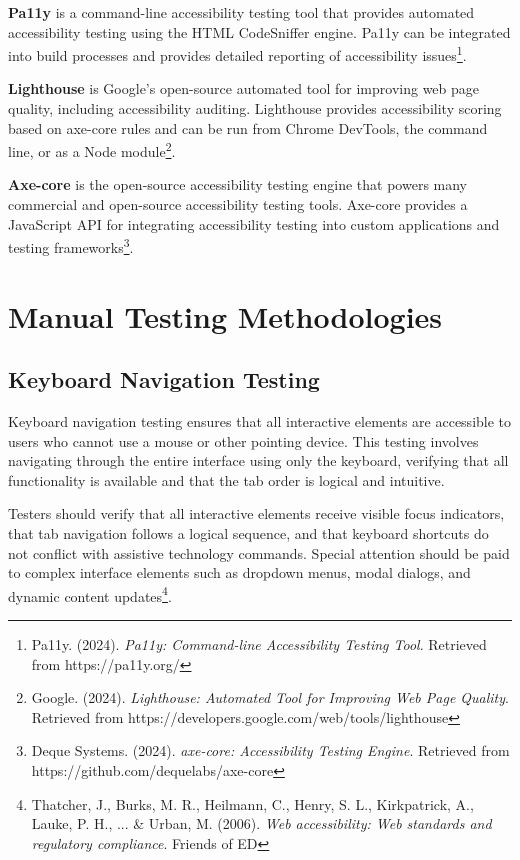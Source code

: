 \textbf{Pa11y} is a command-line accessibility testing tool that provides automated accessibility testing using the HTML CodeSniffer engine. Pa11y can be integrated into build processes and provides detailed reporting of accessibility issues\footnote{Pa11y. (2024). \textit{Pa11y: Command-line Accessibility Testing Tool}. Retrieved from https://pa11y.org/}.

\textbf{Lighthouse} is Google's open-source automated tool for improving web page quality, including accessibility auditing. Lighthouse provides accessibility scoring based on axe-core rules and can be run from Chrome DevTools, the command line, or as a Node module\footnote{Google. (2024). \textit{Lighthouse: Automated Tool for Improving Web Page Quality}. Retrieved from https://developers.google.com/web/tools/lighthouse}.

\textbf{Axe-core} is the open-source accessibility testing engine that powers many commercial and open-source accessibility testing tools. Axe-core provides a JavaScript API for integrating accessibility testing into custom applications and testing frameworks\footnote{Deque Systems. (2024). \textit{axe-core: Accessibility Testing Engine}. Retrieved from https://github.com/dequelabs/axe-core}.

\section{Manual Testing Methodologies}
\label{sec:manual-methods}

\subsection{Keyboard Navigation Testing}

Keyboard navigation testing ensures that all interactive elements are accessible to users who cannot use a mouse or other pointing device. This testing involves navigating through the entire interface using only the keyboard, verifying that all functionality is available and that the tab order is logical and intuitive.

Testers should verify that all interactive elements receive visible focus indicators, that tab navigation follows a logical sequence, and that keyboard shortcuts do not conflict with assistive technology commands. Special attention should be paid to complex interface elements such as dropdown menus, modal dialogs, and dynamic content updates\footnote{Thatcher, J., Burks, M. R., Heilmann, C., Henry, S. L., Kirkpatrick, A., Lauke, P. H., ... \& Urban, M. (2006). \textit{Web accessibility: Web standards and regulatory compliance}. Friends of ED}.

